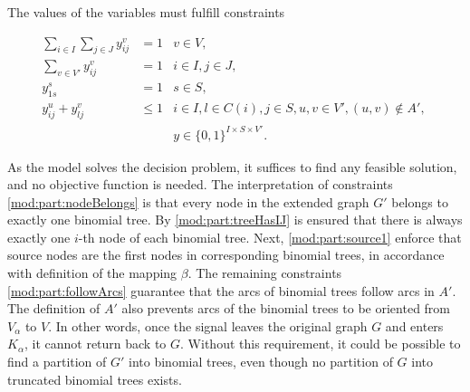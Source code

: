 The values of the variables must fulfill constraints

\begin{subequations}\label{mod:partition}
\begin{align}
\label{mod:part:nodeBelongs} \sum\limits_{i\in I}\sum\limits_{j\in J}y^v_{ij} & = 1 & v\in V,\\
\label{mod:part:treeHasIJ} \sum\limits_{v\in V'}y^v_{ij} & = 1 & i\in I,j\in J,\\
\label{mod:part:source1} y_{1s}^s & = 1  & s\in S,\\
\label{mod:part:followArcs} y^u_{ij}+y^v_{lj} &\leq 1 & i\in I,l\in C(i), j\in S, u,v\in V',(u,v)\not\in A',\\
\label{mod:part:dim}&&y \in \{0,1\}^{I\times S\times V'}.
\end{align}~
\end{subequations}

As the model solves the decision problem, it suffices to find any feasible solution, and no objective function is needed.
The interpretation of constraints \eqref{mod:part:nodeBelongs} is that every node in the extended graph $G'$ belongs to exactly one binomial tree.
By \eqref{mod:part:treeHasIJ} is ensured that there is always exactly one $i$-th node of each binomial tree.
Next, \eqref{mod:part:source1} enforce that source nodes are the first nodes in corresponding binomial trees, in accordance with definition of the mapping $\beta$.
The remaining constraints \eqref{mod:part:followArcs} guarantee that the arcs of binomial trees follow arcs in $A'$.
The definition of $A'$ also prevents arcs of the binomial trees to be oriented from $V_\alpha$ to $V$.
In other words, once the signal leaves the original graph $G$ and enters $K_\alpha$, it cannot return back to $G$.
Without this requirement, it could be possible to find a partition of $G'$ into binomial trees, even though no partition of $G$ into truncated binomial trees exists.




